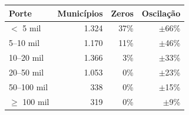 \begin{tabular}{@{}lrrr@{}}
\toprule
\textbf{Porte} & \textbf{Municípios} & \textbf{Zeros} & \textbf{Oscilação}\\
\midrule
$<$ 5 mil & 1.324 & 37\% & $\pm$66\%\\
5–10 mil & 1.170 & 11\% & $\pm$46\%\\
10–20 mil & 1.366 & 3\% & $\pm$33\%\\
\rowcolor{fundo}20–50 mil & 1.053 & 0\% & $\pm$23\%\\
\rowcolor{fundo}50–100 mil & 338 & 0\% & $\pm$15\%\\
\rowcolor{fundo}$\geq$ 100 mil & 319 & 0\% & $\pm$9\%\\
\bottomrule
\end{tabular}
